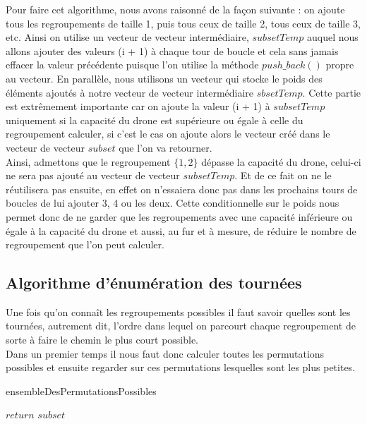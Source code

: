 \documentclass[a4paper,sffamily,12pt]{article}
\begin{document}
				Pour faire cet algorithme, nous avons raisonné de la façon suivante : on ajoute tous les regroupements de taille 1, puis tous ceux de taille 2, tous ceux de taille 3, etc. Ainsi on utilise un vecteur de vecteur intermédiaire, $subsetTemp$ auquel nous allons ajouter des valeurs (i + 1) à chaque tour de boucle et cela sans jamais effacer la valeur précédente puisque l'on utilise la méthode $push\_back()$ propre au vecteur. En parallèle, nous utilisons un vecteur qui stocke le poids des éléments ajoutés à notre vecteur de vecteur intermédiaire $sbsetTemp$. Cette partie est extrêmement importante car on ajoute la valeur (i + 1) à $subsetTemp$ uniquement si la capacité du drone est supérieure ou égale à celle du regroupement calculer, si c'est le cas on ajoute alors le vecteur créé dans le vecteur de vecteur $subset$ que l'on va retourner.\\
			\indent Ainsi, admettons que le regroupement $\{1,2\}$ dépasse la capacité du drone, celui-ci ne sera pas ajouté au vecteur de vecteur $subsetTemp$. Et de ce fait on ne le réutilisera pas ensuite, en effet on n'essaiera donc pas dans les prochains tours de boucles de lui ajouter 3, 4 ou les deux. Cette conditionnelle sur le poids nous permet donc de ne garder que les regroupements avec une capacité inférieure ou égale à la capacité du drone et aussi, au fur et à mesure, de réduire le nombre de regroupement que l'on peut calculer.
						
			\newpage

		
		\subsection{Algorithme d'énumération des tournées}	
			
			\vspace{0.5cm}

			Une fois qu'on connaît les regroupements possibles il faut savoir quelles sont les tournées, autrement dit, l'ordre dans lequel on parcourt chaque regroupement de sorte à faire le chemin le plus court possible.\\
			\indent Dans un premier temps il nous faut donc calculer toutes les permutations possibles et ensuite regarder sur ces permutations lesquelles sont les plus petites.


			\IncMargin{1em}
			\begin{algorithm}
				\caption{ensembleDesPermutationsPossibles}				
				\BlankLine
				
				$return$ $subset$ \\
			\end{algorithm}\DecMargin{1em}
\end{document}

